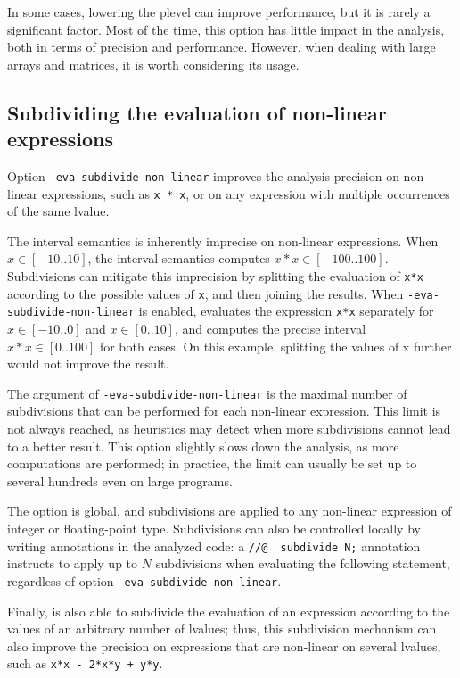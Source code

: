 \documentclass{frama-c-book}
\begin{document}
In some cases, lowering the plevel can improve performance, but it is rarely
a significant factor. Most of the time, this option has little impact in the
analysis, both in terms of precision and performance. However, when dealing
with large arrays and matrices, it is worth considering its usage.


\subsection{Subdividing the evaluation of non-linear expressions}
\label{subdividing-evaluation}

Option \verb|-eva-subdivide-non-linear| improves the analysis precision on
non-linear expressions, such as \lstinline|x * x|,
or on any expression with multiple occurrences of the same lvalue.

The interval semantics is inherently imprecise on non-linear expressions.
When $x \in [-10..10]$, the interval semantics computes $x*x \in [-100..100]$.
Subdivisions can mitigate this imprecision by splitting the evaluation of
\lstinline|x*x| according to the possible values of \lstinline|x|,
and then joining the results.
When \verb|-eva-subdivide-non-linear| is enabled, \Eva{} evaluates the
expression \lstinline|x*x| separately for $x \in [-10..0]$ and $x \in [0..10]$,
and computes the precise interval $x*x \in [0..100]$ for both cases.
On this example, splitting the values of x further would not improve the result.

The argument of \verb|-eva-subdivide-non-linear| is the maximal number of
subdivisions that can be performed for each non-linear expression.
This limit is not always reached, as heuristics may detect when more
subdivisions cannot lead to a better result.
This option slightly slows down the analysis, as more computations are performed;
in practice, the limit can usually be set up to several hundreds even on
large programs.

The option is global, and subdivisions are applied to any non-linear expression
of integer or floating-point type.
Subdivisions can also be controlled locally by writing annotations
in the analyzed code:
a \lstinline|//@  subdivide N;| annotation instructs \Eva{}
to apply up to $N$ subdivisions when evaluating the following statement,
regardless of option \verb|-eva-subdivide-non-linear|.

Finally, \Eva is also able to subdivide the evaluation of an expression
according to the values of an arbitrary number of lvalues;
thus, this subdivision mechanism can also improve the precision on expressions
that are non-linear on several lvalues, such as \lstinline|x*x - 2*x*y + y*y|.
\end{document}
